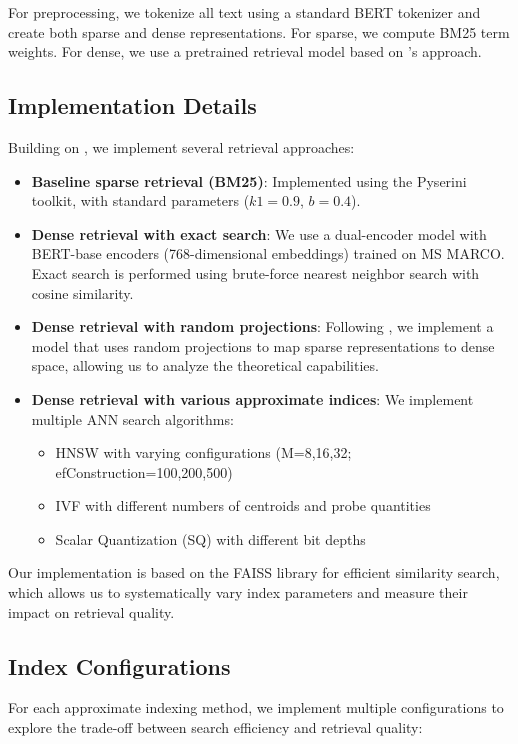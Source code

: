 \documentclass[sigconf,review]{acmart}
\begin{document}
For preprocessing, we tokenize all text using a standard BERT tokenizer and create both sparse and dense representations. For sparse, we compute BM25 term weights. For dense, we use a pretrained retrieval model based on \citet{tay2020sparse}'s approach.

\subsection{Implementation Details}
Building on \citet{tay2020sparse}, we implement several retrieval approaches:

\begin{itemize}
\item \textbf{Baseline sparse retrieval (BM25)}: Implemented using the Pyserini toolkit, with standard parameters ($k1=0.9$, $b=0.4$).

\item \textbf{Dense retrieval with exact search}: We use a dual-encoder model with BERT-base encoders (768-dimensional embeddings) trained on MS MARCO. Exact search is performed using brute-force nearest neighbor search with cosine similarity.

\item \textbf{Dense retrieval with random projections}: Following \citet{tay2020sparse}, we implement a model that uses random projections to map sparse representations to dense space, allowing us to analyze the theoretical capabilities.

\item \textbf{Dense retrieval with various approximate indices}: We implement multiple ANN search algorithms:
\begin{itemize}
    \item HNSW with varying configurations (M=8,16,32; efConstruction=100,200,500)
    \item IVF with different numbers of centroids and probe quantities
    \item Scalar Quantization (SQ) with different bit depths
\end{itemize}
\end{itemize}

Our implementation is based on the FAISS library for efficient similarity search, which allows us to systematically vary index parameters and measure their impact on retrieval quality.

\subsection{Index Configurations}
For each approximate indexing method, we implement multiple configurations to explore the trade-off between search efficiency and retrieval quality:
\end{document}
